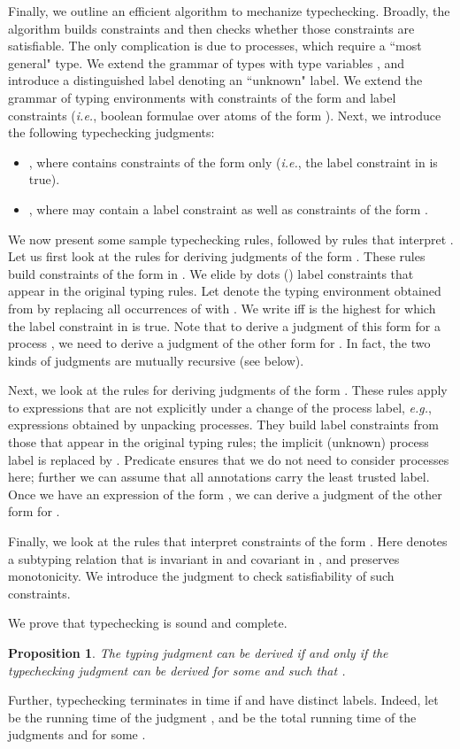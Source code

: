 \documentclass{sigplanconf}
\newtheorem{proposition}[definition]{Proposition}
\begin{document}
\noindent
Finally, we outline an efficient algorithm to mechanize typechecking. Broadly, the algorithm builds constraints and then checks whether those constraints are satisfiable. The only complication is due to  processes, which require a ``most general" type. We extend the grammar of types with type variables , and introduce a distinguished label  denoting an ``unknown" label. We extend the grammar of typing environments with constraints of the form  and label constraints (\emph{i.e.}, boolean formulae over atoms of the form ).  Next, we introduce the following typechecking judgments: 
\begin{itemize}
\item , where  contains constraints of the form  only (\emph{i.e.}, the label constraint in  is true). 
\item , where  may contain a label constraint as well as constraints of the form . 
\end{itemize}
We now present some sample typechecking rules, followed by rules that interpret . Let us first look at the rules for deriving judgments of the form . These rules build constraints of the form  in . We elide by dots () label constraints that appear in the original typing rules. Let  denote the typing environment obtained from  by replacing all occurrences of  with . We write  iff  is the highest  for which the label constraint in  is true. Note that to derive a judgment of this form for a process , we need to derive a judgment of the other form for . In fact, the two kinds of judgments are mutually recursive (see below).


Next, we look at the rules for deriving judgments of the form . These rules apply to expressions that are not explicitly under a change of the process label, \emph{e.g.}, expressions obtained by unpacking  processes. They build label constraints from those that appear in the original typing rules; the implicit (unknown) process label is replaced by . Predicate  ensures that we do not need to consider  processes here; further we can assume that all annotations carry the least trusted label. Once we have an expression of the form , we can derive a judgment of the other form for .


Finally, we look at the rules that interpret constraints of the form . Here  denotes a subtyping relation that is invariant in  and covariant in , and preserves monotonicity. We introduce the judgment  to check satisfiability of such constraints.

We prove that typechecking is sound and complete.
\begin{proposition}
The typing judgment  can be derived if and only if the typechecking judgment  can be derived for some  and  such that .  
\end{proposition}
\noindent
Further, typechecking terminates in time  if  and  have  distinct labels. Indeed, let  be the running time of the judgment , and  be the total running time of the judgments  and  for some . 
\end{document}

